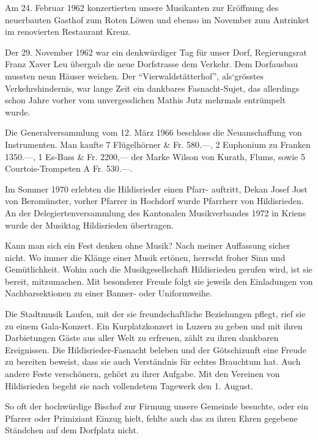 \begin{multicols}{2}
    Am 24. Februar 1962 konzertierten unsere Musikanten
    zur Eröffnung des neuerbauten Gasthof zum Roten
    Löwen und ebenso im November zum Antrinket im
    renovierten Restaurant Kreuz.

    Der 29. November 1962 war ein denkwürdiger Tag für
    unser Dorf, Regierungsrat Franz Xaver Leu übergab
    die neue Dorfstrasse dem Verkehr. Dem Dorfausbau
    mussten neun Häuser weichen. Der "`Vierwaldstätterhof"', als`grösstes Verkehrshindernis, war lange Zeit
    ein dankbares Fasnacht-Sujet, das allerdings schon
    Jahre vorher vom unvergesslichen Mathis Jutz mehrmals
    entrümpelt wurde.

    Die Generalversammlung vom 12. März 1966 beschloss
    die Neuanschaffung von Instrumenten. Man kaufte
    7 Flügelhörner & Fr. 580.—, 2 Euphonium zu Franken
    1350.—, 1 Es-Bass & Fr. 2200,— der Marke Wilson
    von Kurath, Flums, sowie 5 Courtois-Trompeten A
    Fr. 530.—.

    Im Sommer 1970 erlebten die Hildisrieder einen Pfarr-
    auftritt, Dekan Josef Jost von Beromünster, vorher
    Pfarrer in Hochdorf wurde Pfarrherr von Hildisrieden.
    An der Delegiertenversammlung des Kantonalen
    Musikverbandes 1972 in Kriens wurde der Musiktag
    Hildisrieden übertragen.

    Kann man sich ein Fest denken ohne Musik? Nach
    meiner Auffassung sicher nicht. Wo immer die Klänge
    einer Musik ertönen, herrscht froher Sinn und Gemütlichkeit.
    Wohin auch die Musikgesellschaft Hildisrieden gerufen wird, ist sie bereit, mitzumachen.
    Mit besonderer Freude folgt sie jeweils den Einladungen
    von Nachbarsektionen zu einer Banner- oder Uniformweihe.

    Die Stadtmusik Laufen, mit der sie freundschaftliche
    Beziehungen pflegt, rief sie zu einem Gala-Konzert.
    Ein Kurplatzkonzert in Luzern zu geben und mit
    ihren Darbietungen Gäste aus aller Welt zu erfreuen,
    zählt zu ihren dankbaren Ereignissen. Die Hildisrieder-Fasnacht beleben und der Götschizunft eine
    Freude zu bereiten beweist, dass sie auch Verständnis
    für echtes Brauchtum hat. Auch andere Feste verschönern, gehört zu ihrer Aufgabe. Mit den Vereinen
    von Hildisrieden begeht sie nach vollendetem Tagewerk
    den 1. August.

    So oft der hochwürdige Bischof zur Firmung unsere
    Gemeinde besuchte, oder ein Pfarrer oder Primiziant
    Einzug hielt, fehlte auch das zu ihren Ehren gegebene
    Ständchen auf dem Dorfplatz nicht.


\end{multicols}

